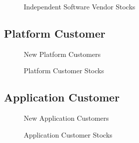 	\begin{figure}[htb]
		\centering
		
		\caption{Independent Software Vendor Stocks}
	\end{figure}

	\newpage
	\subsection{Platform Customer}\label{ch:app05:cs:pc}
	
	\begin{figure}[htb]
		\centering
		
		\caption{New Platform Customers}
	\end{figure}

	\begin{figure}[htb]
		\centering
		
		\caption{Platform Customer Stocks}
		\label{fig:sim:pcs}
	\end{figure}

	\newpage
	\subsection{Application Customer}\label{ch:app05:cs:ac}
	
	\begin{figure}[htb]
		\centering
		
		\caption{New Application Customers}
	\end{figure}

	\begin{figure}[htb]
		\centering
		
		\caption{Application Customer Stocks}
	\end{figure}